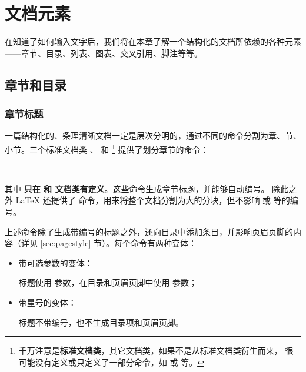 \chapter{文档元素}\label{chap:elements}

\begin{intro}
在知道了如何输入文字后，我们将在本章了解一个结构化的文档所依赖的各种元素——章节、目录、列表、图表、交叉引用、脚注等等。
\end{intro}

\section{章节和目录}\label{sec:secs}

\subsection{章节标题}\label{subsec:secs}


一篇结构化的、条理清晰文档一定是层次分明的，通过不同的命令分割为章、节、小节。三个标准文档类 、 和 %
\footnote{千万注意是\textbf{标准文档类}，其它文档类，如果不是从标准文档类衍生而来，
很可能没有定义或只定义了一部分命令，如  或  等。}%
提供了划分章节的命令：
\begin{command}
 \quad
{} \quad
{} \\
 \quad
{} \quad
{}
\end{command}
其中  \textbf{只在  和  文档类有定义}。这些命令生成章节标题，并能够自动编号。
除此之外 \LaTeX{} 还提供了  命令，用来将整个文档分割为大的分块，但不影响  或  等的编号。

上述命令除了生成带编号的标题之外，还向目录中添加条目，并影响页眉页脚的内容（详见 \ref{sec:pagestyle} 节）。每个命令有两种变体：
\begin{itemize}
  \item 带可选参数的变体：\par
  标题使用  参数，在目录和页眉页脚中使用  参数；
  \item 带星号的变体：\par
  标题不带编号，也不生成目录项和页眉页脚。
\end{itemize}

